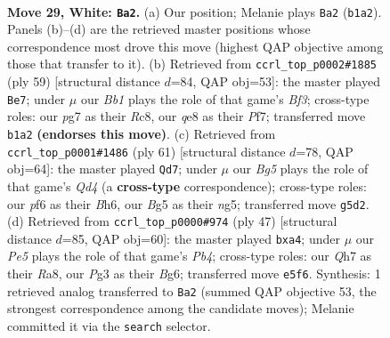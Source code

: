 \documentclass[11pt]{article}
\begin{document}
\clearpage

\begin{figure}[p]\centering
\begin{subfigure}{0.46\textwidth}\centering
\resizebox{\linewidth}{!}{%
\newchessgame
\chessboard[
  setfen={rn1rqk2/pp4pQ/5p2/2P1P1B1/8/P5P1/1P3P2/1BR1R1K1 w - - 1 29},
  showmover=false,
  pgfstyle=straightmove, color=movearrow, markmove={b1-a2}
]}
\caption{}
\end{subfigure}\hfill
\begin{subfigure}{0.46\textwidth}\centering
\resizebox{\linewidth}{!}{%
\newchessgame
\chessboard[
  setfen={2r2r1k/p1p2pp1/bp3b1N/8/1P6/q3P1P1/B1QR1PP1/2R1K3 b - - 0 30},
  showmover=false,
  pgfstyle=straightmove, color=movearrow, markmove={f6-e7}
]}
\caption{}
\end{subfigure}
\\[4pt]
\begin{subfigure}{0.46\textwidth}\centering
\resizebox{\linewidth}{!}{%
\newchessgame
\chessboard[
  setfen={1r3r1k/p7/7b/3q1pNP/1ppP1P2/P7/1P4Q1/K2R2R1 b - - 1 31},
  showmover=false,
  pgfstyle=straightmove, color=movearrow, markmove={d5-d7}
]}
\caption{}
\end{subfigure}\hfill
\begin{subfigure}{0.46\textwidth}\centering
\resizebox{\linewidth}{!}{%
\newchessgame
\chessboard[
  setfen={r4rk1/5p1p/4p1b1/qpQ5/P2N4/7P/1P3PP1/R2R2K1 b - - 0 24},
  showmover=false,
  pgfstyle=straightmove, color=movearrow, markmove={b5-a4}
]}
\caption{}
\end{subfigure}
\caption{\textbf{Move 29, White: \texttt{Ba2}.} (a) Our position; Melanie plays \texttt{Ba2} (\texttt{b1a2}). Panels (b)--(d) are the retrieved master positions whose correspondence most drove this move (highest QAP objective among those that transfer to it). (b) Retrieved from \texttt{ccrl\_top\_p0002\#1885} (ply 59) [structural distance $d$=84, QAP obj=53]: the master played \texttt{Be7}; under $\mu$ our \emph{Bb1} plays the role of that game's \emph{Bf3}; cross-type roles: our \emph{p}g7 as their \emph{R}c8, our \emph{q}e8 as their \emph{P}f7; transferred move \texttt{b1a2} \textbf{(endorses this move)}. (c) Retrieved from \texttt{ccrl\_top\_p0001\#1486} (ply 61) [structural distance $d$=78, QAP obj=64]: the master played \texttt{Qd7}; under $\mu$ our \emph{Bg5} plays the role of that game's \emph{Qd4} (a \textbf{cross-type} correspondence); cross-type roles: our \emph{p}f6 as their \emph{B}h6, our \emph{B}g5 as their \emph{n}g5; transferred move \texttt{g5d2}. (d) Retrieved from \texttt{ccrl\_top\_p0000\#974} (ply 47) [structural distance $d$=85, QAP obj=60]: the master played \texttt{bxa4}; under $\mu$ our \emph{Pe5} plays the role of that game's \emph{Pb4}; cross-type roles: our \emph{Q}h7 as their \emph{R}a8, our \emph{P}g3 as their \emph{B}g6; transferred move \texttt{e5f6}. Synthesis: 1 retrieved analog transferred to \texttt{Ba2} (summed QAP objective 53, the strongest correspondence among the candidate moves); Melanie committed it via the \texttt{search} selector.}
\label{fig:thought-m56}
\end{figure}
\end{document}
